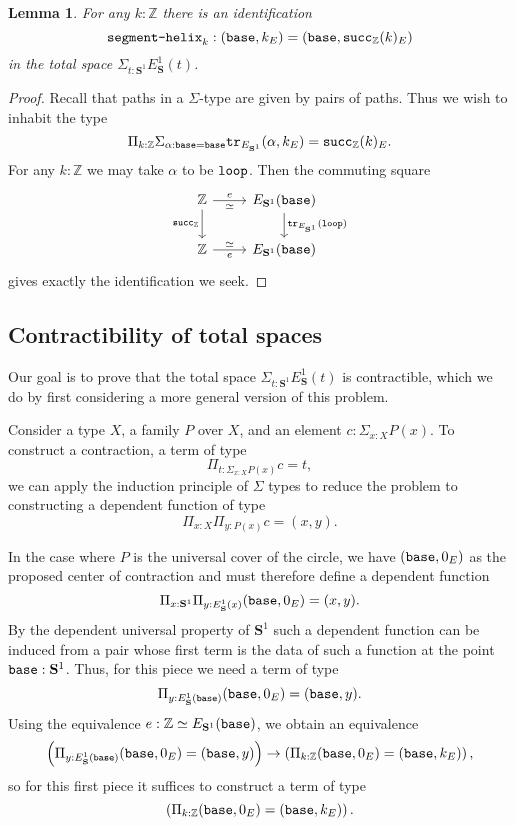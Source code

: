\documentclass{amsart}
\theoremstyle{theorem}
\newtheorem*{lem}{Lemma}
\theoremstyle{definition}
\theoremstyle{remark}
\newcommand{\0}{\mathbbe{0}}
\newcommand{\1}{\mathbbe{1}}
\newcommand{\2}{\mathbbe{2}}
\newcommand{\3}{\mathbbe{3}}
\newcommand{\4}{\mathbbe{4}}
\newcommand{\ZZ}{\mathbb{Z}}
\newcommand{\term}[1]{{\textup{\texttt{#1}}}}
\newcommand{\tr}{\term{tr}}
\newcommand{\Sone}{\mathbf{S}^1}
\newcommand{\base}{\term{base}}
\newcommand{\lloop}{\term{loop}}
\begin{document}
\begin{lem} For any $k : \ZZ$ there is an identification
\[ \term{segment-helix}_k : (\base, k_E) = (\base, \term{succ}_\ZZ(k)_E)\]
in the total space $\Sigma_{t: \Sone} E_\Sone(t)$.
\end{lem}
\begin{proof}
Recall that paths in a $\Sigma$-type are given by pairs of paths. Thus we wish to inhabit the type
\[ \Pi_{k : \ZZ} \Sigma_{\alpha : \base = \base} \tr_{E_{\Sone}}(\alpha,k_E) = \term{succ}_\ZZ(k)_E.\] For any $k : \ZZ$ we may take $\alpha$ to be $\lloop$. Then the commuting square
\[ 
\begin{tikzcd}
\ZZ \arrow[d, "\term{succ}_\ZZ"']  \arrow[r, "e", "\simeq"'] & E_{\Sone}(\base) \arrow[d, "\tr_{E_{\Sone}}(\lloop)"] \\ \ZZ \arrow[r, "e"', "\simeq"] & E_{\Sone}(\base)
\end{tikzcd}
\]
gives exactly the identification we seek.
\end{proof}

\subsection*{Contractibility of total spaces}

Our goal is to prove that the total space $\Sigma_{t: \Sone} E_\Sone(t)$ is contractible, which we do by first considering a more general version of this problem.

Consider a type $X$, a family $P$ over $X$, and an element $c : \Sigma_{x:X} P(x)$. To construct a contraction, a term of type
\[ \Pi_{t : \Sigma_{x:X}P(x)} c  =t,\] we can apply the induction principle of $\Sigma$ types to reduce the problem to constructing a dependent function of type
\[ \Pi_{x:X} \Pi_{y: P(x)} c = (x,y).\]

In the case where $P$ is the universal cover of the circle, we have $(\base,0_E)$ as the proposed center of contraction and must therefore define a dependent function
\[
\Pi_{x : \Sone} \Pi_{y : E_\Sone(x)} (\base,0_E) = (x,y).\]
By the dependent universal property of $\Sone$ such a dependent function can be induced from a pair whose first term is the data of such a function at the point $\base : \Sone$. Thus, for this piece we need a term of type 
\[\Pi_{y: E_\Sone(\base)} (\base,0_E)=(\base,y) .\]
 Using the equivalence $e : \ZZ \simeq E_{\Sone}(\base)$, we obtain an equivalence
\[ 
\left(\Pi_{y: E_\Sone(\base)} (\base,0_E)=(\base,y) \right) \to \left(\Pi_{k :\ZZ} (\base,0_E) = (\base,k_E) \right),\]
so for this first piece it suffices to construct a term of type 
\[
 \left(\Pi_{k :\ZZ} (\base,0_E) = (\base,k_E) \right).\]
\end{document}
